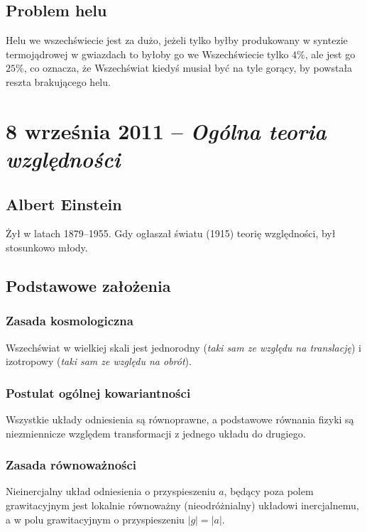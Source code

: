 \documentclass [a4paper, 11pt, oneside]{book}
\begin{document}
	\section{Problem helu}
	Helu we wszechświecie jest za dużo, jeżeli tylko byłby produkowany w syntezie termojądrowej w gwiazdach to byłoby go we Wszechświecie tylko $4\%$, ale jest go $25\%$, co oznacza, że Wszechświat kiedyś musiał być na tyle gorący, by powstała reszta brakującego helu.

\chapter{8 września 2011 -- \textit{Ogólna teoria względności}} %
\label{cha:8_wrze_nia_2011_textit}
	\section{Albert Einstein} %
	\label{sec:albert_einstein}
		Żył w latach 1879--1955. Gdy ogłaszał światu (1915) teorię względności, był stosunkowo młody.
	\section{Podstawowe założenia} %
	\label{sec:podstawowe_za_o_enia}
		\subsection{Zasada kosmologiczna} %
		\label{sub:zasada_kosmologiczna}
			Wszechświat w wielkiej skali jest jednorodny (\textit{taki sam ze względu na translację}) i izotropowy (\textit{taki sam ze względu na obrót}).

		\subsection{Postulat ogólnej kowariantności} %
		\label{sub:postulat_ogolnej_kowariantnosci}
			Wszystkie układy odniesienia są równoprawne, a podstawowe równania fizyki są niezmiennicze względem transformacji z jednego układu do drugiego.

		\subsection{Zasada równoważności} %
		\label{sub:zasada_r_wnowa_no_ci}
			Nieinercjalny układ odniesienia o przyspieszeniu $a$, będący poza polem grawitacyjnym jest lokalnie równoważny (nieodróżnialny) układowi inercjalnemu, a w polu grawitacyjnym o przyspieszeniu $|g| = |a|$.
\end{document}
